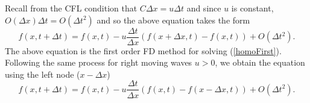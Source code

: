 %
Recall from the CFL condition that $C \Delta x = u \Delta t$ and since $u$ is constant, $O(\Delta x) \Delta t = O(\Delta t^2)$ and so the above equation takes the form
%
\begin{equation}
\label{firstOrderHomoLeft}
f(x,t+\Delta t) = f(x,t) - u \frac{\Delta t}{\Delta x} \left(f(x+\Delta x,t) - f(x,t)\right) + O(\Delta t^2).
\end{equation}
%
The above equation is the first order FD method for solving (\ref{homoFirst}). Following the same process for right moving waves $u>0$, we obtain the equation using the left node ($x - \Delta x$)
%
\begin{equation}
\label{firstOrderHomoRight}
f(x,t+\Delta t) = f(x,t) - u \frac{\Delta t}{\Delta x} \left(f(x,t) - f(x - \Delta x,t)\right) + O(\Delta t^2).
\end{equation}
